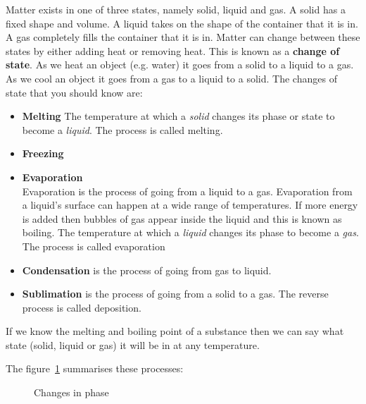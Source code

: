\par 
\label{m38736*id48327}Matter exists in one of three states, namely solid, liquid and gas. A solid has a fixed shape and volume. A liquid takes on the shape of the container that it is in. A gas completely fills the container that it is in. Matter can change between these states by either adding heat or removing heat. This is known as a \textbf{change of state}. As we heat an object (e.g. water) it goes from a solid to a liquid to a gas. As we cool an object it goes from a gas to a liquid to a solid.
The changes of state that you should know are:
\label{m38736*id02341}\begin{itemize}[noitemsep]
\item \textbf{Melting} 
 {The temperature at which a \textsl{solid} changes its phase or state to become a \textsl{liquid}. The  process is called melting. } 
\item \textbf{Freezing} 
\item \textbf{Evaporation} \\
Evaporation is the process of going from a liquid to a gas. Evaporation from a liquid's surface can happen at a wide range of temperatures. If more energy is added then bubbles of gas appear inside the liquid and this is known as boiling.
 {The temperature at which a \textsl{liquid} changes its phase to become a \textsl{gas}. The process is called evaporation} 
\item \textbf{Condensation} is the process of going from gas to liquid.
\item \textbf{Sublimation} is the process of going from a solid to a gas. The reverse process is called deposition.\end{itemize}
\par \label{m38736*eip-957}If we know the melting and boiling point of a substance then we can say what state (solid, liquid or gas) it will be in at any temperature. \par 
The figure~\ref{fig:PhaseChanges} summarises these processes: \\
    \setcounter{subfigure}{0}
\begin{figure}[H]
\begin{center}
\caption{Changes in phase}
\label{fig:PhaseChanges}
\end{center}
\end{figure} 

